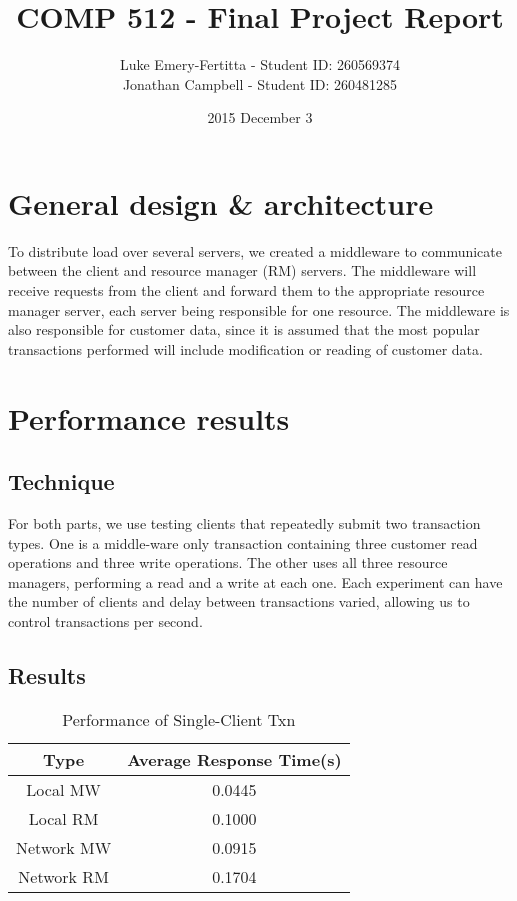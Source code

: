 \documentclass[11pt]{article}
\begin{document}
\title{COMP 512 - Final Project Report}
\author{Luke Emery-Fertitta - Student ID: 260569374 \\ Jonathan Campbell - Student ID: 260481285}
\date{2015 December 3}
\maketitle

\section*{General design & architecture}

To distribute load over several servers, we created a middleware to communicate between the client and resource manager (RM) servers. The middleware will receive requests from the client and forward them to the appropriate resource manager server, each server being responsible for one resource. The middleware is also responsible for customer data, since it is assumed that the most popular transactions performed will include modification or reading of customer data.  \par

\section*{Performance results}

\subsection*{Technique}

For both parts, we use testing clients that repeatedly submit two transaction types. One is a middle-ware only transaction containing three customer read operations and three write operations. The other uses all three resource managers, performing a read and a write at each one. Each experiment can have the number of clients and delay between transactions varied, allowing us to control transactions per second.

\subsection*{Results}

\begin{table}[H]
\centering
\caption{Performance of Single-Client Txn}
\begin{tabular}{c|c}
Type & Average Response Time(s) \\
\hline
Local MW & 0.0445 \\
Local RM & 0.1000 \\
Network MW & 0.0915 \\
Network RM & 0.1704 \\
\end{tabular}
\end{table}
\end{document}
